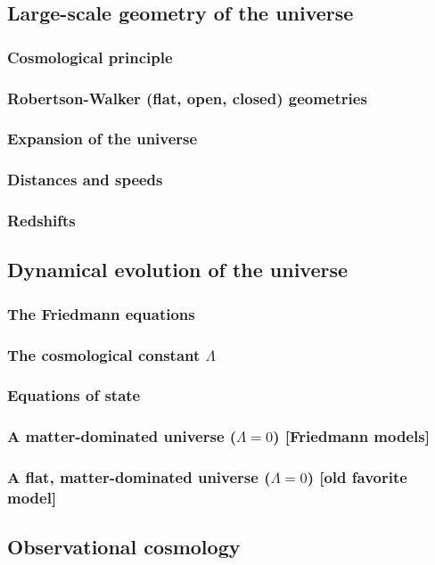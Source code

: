 \documentclass{article}
\theoremstyle{definition}
\begin{document}
\subsection{Large-scale geometry of the universe}
\subsubsection{Cosmological principle}
\subsubsection{Robertson-Walker (flat, open, closed) geometries}
\subsubsection{Expansion of the universe}
\subsubsection{Distances and speeds}
\subsubsection{Redshifts}
\subsection{Dynamical evolution of the universe}
\subsubsection{The Friedmann equations}
\subsubsection{The cosmological constant $\Lambda$}
\subsubsection{Equations of state}
\subsubsection{A matter-dominated universe ($\Lambda = 0$) [Friedmann models]}
\subsubsection{A flat, matter-dominated universe ($\Lambda = 0$) [old favorite model]}
\subsection{Observational cosmology}
\end{document}
